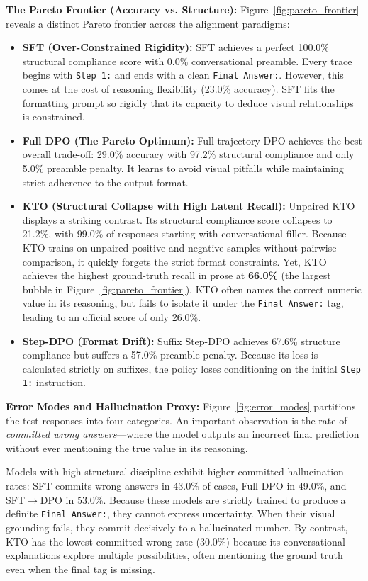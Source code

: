 \documentclass[11pt]{article}
\begin{document}
\textbf{The Pareto Frontier (Accuracy vs. Structure):}
Figure~\ref{fig:pareto_frontier} reveals a distinct Pareto frontier across the alignment paradigms:
\begin{itemize}[noitemsep,topsep=0pt]
    \item \textbf{SFT (Over-Constrained Rigidity):} SFT achieves a perfect 100.0\% structural compliance score with 0.0\% conversational preamble. Every trace begins with \texttt{Step 1:} and ends with a clean \texttt{Final Answer:}. However, this comes at the cost of reasoning flexibility (23.0\% accuracy). SFT fits the formatting prompt so rigidly that its capacity to deduce visual relationships is constrained.
    \item \textbf{Full DPO (The Pareto Optimum):} Full-trajectory DPO achieves the best overall trade-off: 29.0\% accuracy with 97.2\% structural compliance and only 5.0\% preamble penalty. It learns to avoid visual pitfalls while maintaining strict adherence to the output format.
    \item \textbf{KTO (Structural Collapse with High Latent Recall):} Unpaired KTO displays a striking contrast. Its structural compliance score collapses to 21.2\%, with 99.0\% of responses starting with conversational filler. Because KTO trains on unpaired positive and negative samples without pairwise comparison, it quickly forgets the strict format constraints. Yet, KTO achieves the highest ground-truth recall in prose at \textbf{66.0\%} (the largest bubble in Figure~\ref{fig:pareto_frontier}). KTO often names the correct numeric value in its reasoning, but fails to isolate it under the \texttt{Final Answer:} tag, leading to an official score of only 26.0\%.
    \item \textbf{Step-DPO (Format Drift):} Suffix Step-DPO achieves 67.6\% structure compliance but suffers a 57.0\% preamble penalty. Because its loss is calculated strictly on suffixes, the policy loses conditioning on the initial \texttt{Step 1:} instruction.
\end{itemize}

\textbf{Error Modes and Hallucination Proxy:}
Figure~\ref{fig:error_modes} partitions the test responses into four categories. An important observation is the rate of \textit{committed wrong answers}---where the model outputs an incorrect final prediction without ever mentioning the true value in its reasoning.

Models with high structural discipline exhibit higher committed hallucination rates: SFT commits wrong answers in 43.0\% of cases, Full DPO in 49.0\%, and SFT$\rightarrow$DPO in 53.0\%. Because these models are strictly trained to produce a definite \texttt{Final Answer:}, they cannot express uncertainty. When their visual grounding fails, they commit decisively to a hallucinated number. By contrast, KTO has the lowest committed wrong rate (30.0\%) because its conversational explanations explore multiple possibilities, often mentioning the ground truth even when the final tag is missing.
\end{document}
